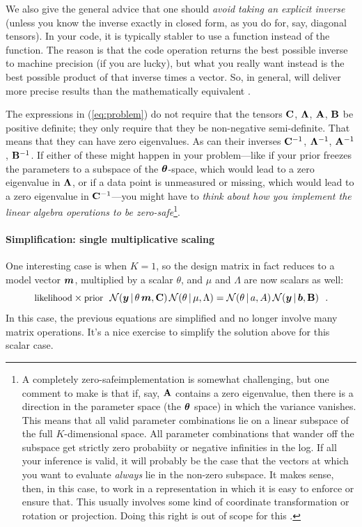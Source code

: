 We also give the general advice that one should \emph{avoid taking an explicit
inverse} (unless you know the inverse exactly in closed form, as you do
for, say, diagonal tensors).
In your code, it is typically stabler to use a  function instead
of the  function.
The reason is that the code operation  returns the best
possible inverse to machine precision (if you are lucky), but what you
really want instead is the best possible product of that inverse times
a vector.
So, in general,  will deliver more precise results than
the mathematically equivalent .

The expressions in (\ref{eq:problem}) do not require that the tensors
$\mathbf{C}$, $\mathbf{\Lambda}$, $\mathbf{A}$, $\mathbf{B}$ be positive definite; they only require
that they be non-negative semi-definite.
That means that they can have zero eigenvalues.
As can their inverses $\mathbf{C}^{-1}$, $\mathbf{\Lambda}^{-1}$, $\mathbf{A}^{-1}$, $\mathbf{B}^{-1}$.
If either of these might happen in your problem---like if your prior
freezes the parameters to a subspace of the $\boldsymbol{\theta}$-space, which
would lead to a zero eigenvalue in $\mathbf{\Lambda}$, or if a data point is
unmeasured or missing, which would lead to a zero eigenvalue in
$\mathbf{C}^{-1}$---you might have to \emph{think about how you implement the
  linear algebra operations to be zero-safe}\footnote{A completely
  zero-safeimplementation
  is somewhat challenging, but one comment to make is that if, say, $\mathbf{A}$
  contains a zero eigenvalue, then there is a direction in the parameter
  space (the $\boldsymbol{\theta}$ space) in which the variance vanishes. This means that
  all valid parameter combinations lie on a linear subspace of the full $K$-dimensional
  space. All parameter combinations that wander off the subspace get strictly
  zero probabiity or negative infinities in the log.
  If all your inference is valid, it will probably be the case that the
  vectors at which you want to evaluate \emph{always} lie in the non-zero
  subspace. It makes sense, then, in this case, to work in a representation in which it is easy
  to enforce or ensure that. This usually involves some kind of coordinate transformation
  or rotation or projection. Doing this right is out of scope for this \documentname.}.

\paragraph{Simplification: single multiplicative scaling}

One interesting case is when $K=1$, so the design matrix in fact
reduces to a model vector $\boldsymbol{m}$, multiplied by a scalar $\theta$, and
$\mu$ and $\Lambda$ are now scalars as well:
\begin{equation}
\mbox{\small likelihood} \times \mbox{\small prior} ~~ \mathcal{N}\!\,(\boldsymbol{y}\,|\,\theta\,\boldsymbol{m},\mathbf{C})\,\mathcal{N}\!\,(\theta\,|\,\mu,\Lambda) = \mathcal{N}\!\,(\theta\,|\, a,A)\,\mathcal{N}\!\,(\boldsymbol{y}\,|\,\boldsymbol{b},\mathbf{B})
~~.
\end{equation}
In this case, the previous equations are simplified and no longer
involve many matrix operations. It's a nice exercise to simplify the
solution above for this scalar case.


